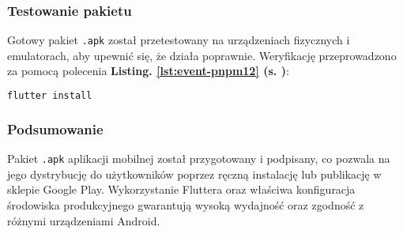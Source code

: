 \subsubsection{Testowanie pakietu}

Gotowy pakiet \texttt{.apk} został przetestowany na urządzeniach fizycznych i emulatorach, aby upewnić się, że działa poprawnie. Weryfikację przeprowadzono za pomocą polecenia \textbf{Listing. \ref{lst:event-pnpm12} (s. \pageref{lst:event-pnpm12})}:
\begin{lstlisting}[language=C++, caption=Testowanie pakietu,  label={lst:event-pnpm12}]
flutter install
\end{lstlisting}

\subsubsection{Podsumowanie}

Pakiet \texttt{.apk} aplikacji mobilnej został przygotowany i podpisany, co pozwala na jego dystrybucję do użytkowników poprzez ręczną instalację lub publikację w sklepie Google Play. Wykorzystanie Fluttera oraz właściwa konfiguracja środowiska produkcyjnego gwarantują wysoką wydajność oraz zgodność z różnymi urządzeniami Android.
